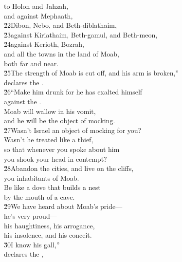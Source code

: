 \begin{poetry}
\poemll    to Holon and Jahzah, \\
\poeml and against Mephaath, \\
\poemll    \v{22}Dibon, Nebo, and Beth-diblathaim, \\
\poeml \v{23}against Kiriathaim, Beth-gamul, and Beth-meon, \\
\poeml \v{24}against Kerioth, Bozrah, \\
\poeml and all the towns in the land of Moab, \\
\poemll    both far and near. \\
\poeml \v{25}The strength of Moab is cut off, and his arm is broken,'' \\
\poemll    declares the . \\
\poeml \v{26}``Make him drunk for he has exalted himself \\
\poemll    against the . \\
\poeml Moab will wallow in his vomit, \\
\poemll    and he will be the object of mocking. \\
\poeml \v{27}Wasn't Israel an object of mocking for you? \\
\poemll    Wasn't he treated like a thief, \\
\poeml so that whenever you spoke about him \\
\poemll    you shook your head in contempt? \\
\poeml \v{28}Abandon the cities, and live on the cliffs, \\
\poemll    you inhabitants of Moab. \\
\poeml Be like a dove that builds a nest \\
\poemll    by the mouth of a cave. \\
\poeml \v{29}We have heard about Moab's pride--- \\
\poemll    he's very proud--- \\
\poeml his haughtiness, his arrogance, \\
\poemll    his insolence, and his conceit. \\
\poeml \v{30}I know his gall,'' \\
\poemll    declares the , \\

\end{poetry}
